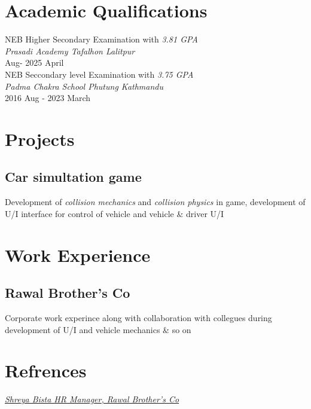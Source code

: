 \documentclass[20pt,a4paper]{article}
\begin{document}
\section*{Academic Qualifications}

NEB Higher Secondary Examination with \emph{3.81 GPA}\\
\;\emph{Prasadi Academy \emph{Tafalhon Lalitpur}}\\
 Aug- 2025 April\\

\noindent NEB Seccondary level Examination with \emph{3.75 GPA} \\
\emph{Padma Chakra School \emph{Phutung Kathmandu}}\\
2016 Aug - 2023 March

\section*{Projects}
\subsection*{Car simultation game}
Development of \emph{collision mechanics} and \emph{collision physics} in game, development of U/I interface for control of vehicle and vehicle \& driver U/I

\section*{Work Experience}
\subsection*{Rawal Brother's Co}
Corporate work experince along with collaboration with collegues during development of U/I and vehicle mechanics \& so on

\section*{Refrences}
\textbullet \hspace{5pt}\underline{\href{mailto:shreyabista094@gmail.com}{\emph{Shreya Bista \emph{HR Manager}, Rawal Brother's Co}}}
\end{document}

